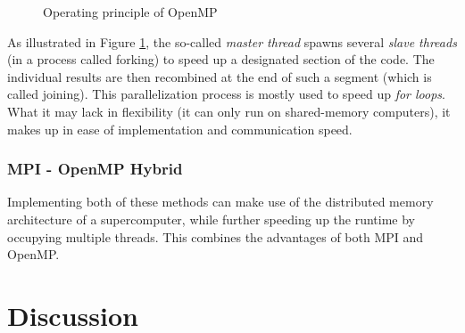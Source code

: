 \documentclass[12pt, a4paper, titlepage]{article}
\begin{document}
{\begin{figure}[h!]
\caption{Operating principle of OpenMP}
\label{fig:openmp}
\end{figure}


As illustrated in Figure \ref{fig:openmp}, the so-called \textit{master thread} spawns several \textit{slave threads} (in a process called forking) to speed up a designated section of the code. The individual results are then recombined at the end of such a segment (which is called joining). This parallelization process is mostly used to speed up \textit{for loops}.\\
What it may lack in flexibility (it can only run on shared-memory computers), it makes up in ease of implementation and communication speed. 


\subsubsection{MPI - OpenMP Hybrid}

Implementing both of these methods can make use of the distributed memory architecture of a supercomputer, while further speeding up the runtime by occupying multiple threads. This combines the advantages of both MPI and OpenMP.



\newpage
\section{Discussion}


}
\end{document}
